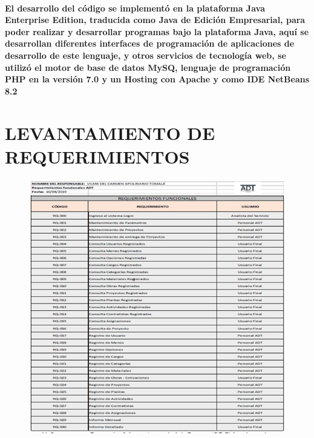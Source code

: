 \documentclass[12pt,a4paper]{article}
\begin{document}
\paragraph{El desarrollo del código se implementó en la plataforma Java Enterprise Edition, traducida como Java de Edición Empresarial, para poder realizar y desarrollar programas bajo la plataforma Java, aquí se desarrollan diferentes interfaces de programación de aplicaciones de desarrollo de este lenguaje, y otros servicios de tecnología web, se utilizó el motor de base de datos MySQ, lenguaje de programación PHP en la versión 7.0 y un Hosting con Apache y como IDE NetBeans 8.2}

\section*{LEVANTAMIENTO DE REQUERIMIENTOS}
\begin{figure}[hbtp]
\caption{}
\centering
\includegraphics[scale=0.5]{SEGUNDA.jpeg}
\end{figure}
\end{document}
